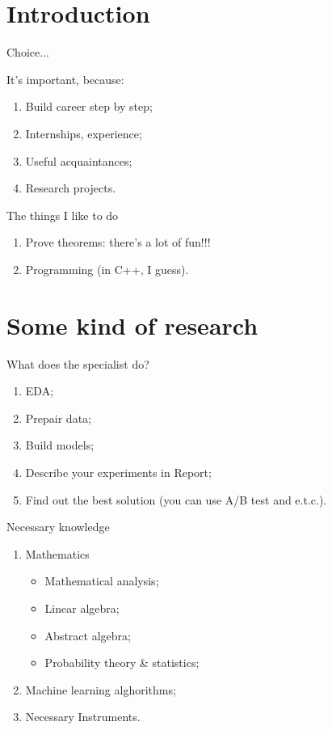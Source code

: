 \AtBeginSection[]{%
  \showHighlightedSectionFrame%
  }%
\frame{\titlepage}


\section{Introduction}
\begin{frame}
  \Huge \color{cscgreen} Choice...
\end{frame}
\begin{frame}{It's important, because:}
  \begin{enumerate}
    \item Build career step by step;
    \item Internships, experience;
    \item Useful acquaintances;
    \item Research projects.
  \end{enumerate}
\end{frame}

\begin{frame}{The things I like to do}
  \begin{enumerate}
    \item Prove theorems: there's a lot of fun!!!
    \item Programming (in C++, I guess).
  \end{enumerate}  
\end{frame}

\section{Some kind of research}
\begin{frame}{What does the specialist do?}
   \begin{enumerate}
     \item EDA;
     \item Prepair data;
     \item Build models;
     \item Describe your experiments in Report;
     \item Find out the best solution (you can use A/B test and e.t.c.).
   \end{enumerate}
\end{frame}

\begin{frame}{Necessary knowledge}
  \begin{enumerate}
    \item Mathematics 
      \begin{itemize}
        \item Mathematical analysis;
        \item Linear algebra;
        \item Abstract algebra;
        \item Probability theory \& statistics;
      \end{itemize}
    \item Machine learning alghorithms;
    \item Necessary Instruments.
  \end{enumerate}
\end{frame}


